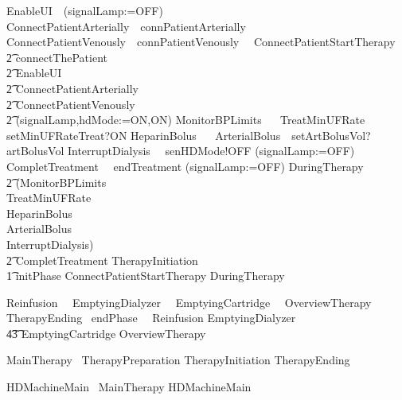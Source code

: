 \begin{circus}
  EnableUI~\circdef~(signalLamp:=OFF)
  ConnectPatientArterially~\circdef~connPatientArterially~\then~\Skip
  ConnectPatientVenously~\circdef~connPatientVenously~\then~\Skip
  ConnectPatientStartTherapy~\circdef~
    \\\t2 connectThePatient \then
    \\\t2 EnableUI \circseq
    \\\t2 ConnectPatientArterially \circseq
    \\\t2 ConnectPatientVenously \circseq
    \\\t2 (signalLamp,hdMode:=ON,ON)
  MonitorBPLimits ~\circdef~\Skip
  TreatMinUFRate ~\circdef~ setMinUFRateTreat?ON \then \Skip
  HeparinBolus ~\circdef~\Skip
  ArterialBolus~\circdef~setArtBolusVol?artBolusVol \then \Skip
  InterruptDialysis~\circdef~ senHDMode!OFF \then (signalLamp:=OFF)
  CompletTreatment~\circdef~ endTreatment \then (signalLamp:=OFF)
  DuringTherapy~\circdef~
        \\\t2 (MonitorBPLimits\\
              \interleave TreatMinUFRate\\
              \interleave HeparinBolus\\
              \interleave ArterialBolus\\
              \interleave InterruptDialysis) \circseq
        \\\t2 CompletTreatment
  TherapyInitiation~\circdef
  \\\t1 initPhase \then ConnectPatientStartTherapy
    \circseq DuringTherapy

  Reinfusion~\circdef~\Skip
  EmptyingDialyzer~\circdef~ \Skip
  EmptyingCartridge~\circdef~\Skip
  OverviewTherapy~\circdef~\Skip
  TherapyEnding~\circdef
    endPhase~\then~ Reinfusion
    \circseq EmptyingDialyzer
    \circseq \\\t4\t3 EmptyingCartridge
    \circseq OverviewTherapy

  MainTherapy~\circdef
    TherapyPreparation
    \circseq TherapyInitiation
    \circseq TherapyEnding

  HDMachineMain~\circdef %
  MainTherapy
  \circspot HDMachineMain
  \circend
\end{circus}
